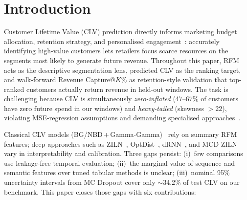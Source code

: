 \documentclass[pdflatex,sn-mathphys-num]{sn-jnl}
\theoremstyle{thmstyleone}
\theoremstyle{thmstyletwo}
\theoremstyle{thmstylethree}
\begin{document}
\maketitle

\section{Introduction}\label{sec:intro}

Customer Lifetime Value (CLV) prediction directly informs marketing
budget allocation, retention strategy, and personalised
engagement~\cite{fader2005rfm,gupta2006clv}: accurately identifying
high-value customers lets retailers focus scarce resources on the
segments most likely to generate future revenue. Throughout this paper, RFM acts as the descriptive segmentation
lens, predicted CLV as the ranking target, and walk-forward
Revenue Capture@$K\%$ as retention-style validation that top-ranked
customers actually return revenue in held-out windows.
The task is challenging because CLV is simultaneously
\emph{zero-inflated} (47--67\% of customers have zero future spend
in our windows) and \emph{heavy-tailed} (skewness $>22$), violating
MSE-regression assumptions and demanding specialised
approaches~\cite{wang2019deep}.

Classical CLV models (BG/NBD\,+\,Gamma-Gamma)~\cite{fader2005counting,
fader2013gammagamma} rely on summary RFM features; deep approaches such
as ZILN~\cite{wang2019deep}, OptDist~\cite{tang2024optdist},
dRNN~\cite{meta2024drnn}, and MCD-ZILN~\cite{mcd2024clv} vary in
interpretability and calibration. Three gaps persist: (i)~few comparisons
use leakage-free temporal evaluation; (ii)~the marginal value of sequence
and semantic features over tuned tabular methods is unclear; (iii)~nominal
95\% uncertainty intervals from MC Dropout cover only $\sim$34.2\% of
test CLV on our benchmark. This paper closes those gaps with six
contributions:
\end{document}

